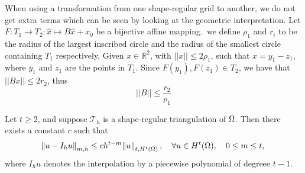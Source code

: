 When using a transformation from one shape-regular grid to another, we do not get extra terms which can be seen by looking at the geometric interpretation.
Let $F:T_1 \to T_2 : \hat{x} \mapsto B\hat{x} + x_0$ be a bijective affine mapping.\ we define $\rho_1$ and $r_i$ to be the radius of the largest inscribed circle and the radius of the smallest circle containing $T_1$ respectively.
Given $x \in \mathbb{R}^2$, with $||x|| \leq 2 \rho_1$, such that $x = y_1 - z_1$, where $y_1$ and $z_1$ are the points in $T_1$. Since $F(y_1), F(z_1) \in T_2$, we have that $||Bx|| \leq 2r_2$, thus
\begin{equation}\label{eq:6.9}
    ||B|| \leq \frac{r_2}{\rho_1}
\end{equation}

\begin{thmx}{\quad\label{thm:6.4}}
    Let $t \geq 2$, and suppose $\mathcal{T}_h$ is a shape-regular triangulation of $\Omega$. Then there exists a constant $c$ such that
    \begin{equation}
        \norm{u - I_h u}_{m,h} \leq c h^{t-m} \norm{u}_{t, H^t(\Omega)}, \quad \forall u \in H^t(\Omega), \quad 0 \leq m \leq t,
        \label{eq:6.5}
    \end{equation}
    where $I_h u$ denotes the interpolation by a piecewise polynomial of degreee $t-1$.
\end{thmx}

